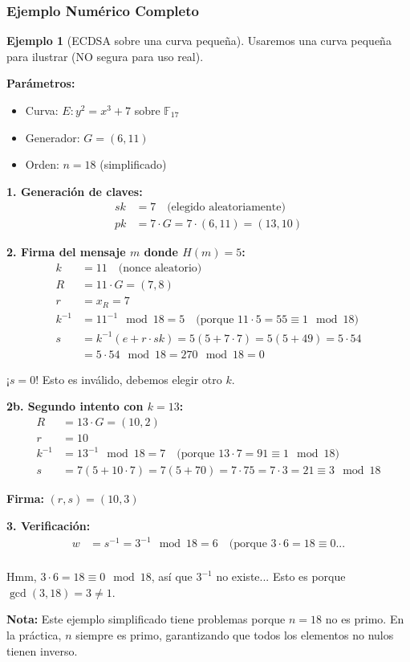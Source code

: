 \documentclass[11pt,a4paper,twoside,openright]{book}
\theoremstyle{definition}
\newtheorem{example}{Ejemplo}[chapter]
\theoremstyle{plain}
\theoremstyle{remark}
\begin{document}
\subsubsection{Ejemplo Numérico Completo}

\begin{example}[ECDSA sobre una curva pequeña]
Usaremos una curva pequeña para ilustrar (NO segura para uso real).

\textbf{Parámetros:}
\begin{itemize}
    \item Curva: $E: y^2 = x^3 + 7$ sobre $\mathbb{F}_{17}$
    \item Generador: $G = (6, 11)$
    \item Orden: $n = 18$ (simplificado)
\end{itemize}

\textbf{1. Generación de claves:}
\begin{align}
sk &= 7 \quad \text{(elegido aleatoriamente)} \\
pk &= 7 \cdot G = 7 \cdot (6, 11) = (13, 10)
\end{align}

\textbf{2. Firma del mensaje $m$ donde $H(m) = 5$:}
\begin{align}
k &= 11 \quad \text{(nonce aleatorio)} \\
R &= 11 \cdot G = (7, 8) \\
r &= x_R = 7 \\
k^{-1} &= 11^{-1} \mod 18 = 5 \quad \text{(porque } 11 \cdot 5 = 55 \equiv 1 \mod 18\text{)} \\
s &= k^{-1}(e + r \cdot sk) = 5(5 + 7 \cdot 7) = 5(5 + 49) = 5 \cdot 54 \\
  &= 5 \cdot 54 \mod 18 = 270 \mod 18 = 0
\end{align}

¡$s = 0$! Esto es inválido, debemos elegir otro $k$.

\textbf{2b. Segundo intento con $k = 13$:}
\begin{align}
R &= 13 \cdot G = (10, 2) \\
r &= 10 \\
k^{-1} &= 13^{-1} \mod 18 = 7 \quad \text{(porque } 13 \cdot 7 = 91 \equiv 1 \mod 18\text{)} \\
s &= 7(5 + 10 \cdot 7) = 7(5 + 70) = 7 \cdot 75 = 7 \cdot 3 = 21 \equiv 3 \mod 18
\end{align}

\textbf{Firma:} $(r, s) = (10, 3)$

\textbf{3. Verificación:}
\begin{align}
w &= s^{-1} = 3^{-1} \mod 18 = 6 \quad \text{(porque } 3 \cdot 6 = 18 \equiv 0... \\
\end{align}

Hmm, $3 \cdot 6 = 18 \equiv 0 \mod 18$, así que $3^{-1}$ no existe... Esto es porque $\gcd(3, 18) = 3 \neq 1$.

\textbf{Nota:} Este ejemplo simplificado tiene problemas porque $n = 18$ no es primo. En la práctica, $n$ siempre es primo, garantizando que todos los elementos no nulos tienen inverso.
\end{example}
\end{document}

